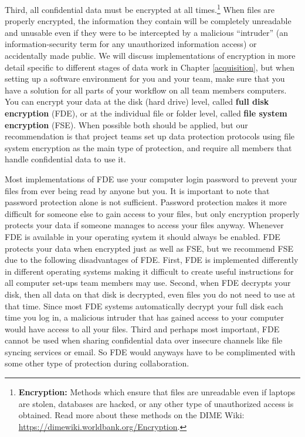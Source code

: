 \documentclass[
]{book}
\begin{document}
Third, all confidential data must be encrypted at all times.\footnote{\textbf{Encryption:} Methods which ensure that files are unreadable
  even if laptops are stolen, databases are hacked,
  or any other type of unauthorized access is obtained.
  Read more about these methods on the DIME Wiki:
  \url{https://dimewiki.worldbank.org/Encryption}.}
When files are properly encrypted,
the information they contain will be completely unreadable and unusable
even if they were to be intercepted by a malicious ``intruder''
(an information-security term for any unauthorized information access)
or accidentally made public.
We will discuss implementations of encryption in more detail
specific to different stages of data work in Chapter \ref{acquisition},
but when setting up a software environment for you and your team,
make sure that you have a solution for
all parts of your workflow on all team members computers.
You can encrypt your data at the disk (hard drive) level,
called \textbf{full disk encryption} (FDE), or at the individual file or folder level,
called \textbf{file system encryption} (FSE).
When possible both should be applied,
but our recommendation is that
project teams set up data protection protocols
using file system encryption as the main type of protection,
and require all members that handle confidential data to use it.

Most implementations of FDE use your computer login password to
prevent your files from ever being read by anyone but you.
It is important to note that password protection alone is not sufficient.
Password protection makes it more difficult for someone else to gain access to your files,
but only encryption properly protects your data if someone manages to access your files anyway.
Whenever FDE is available in your operating system
it should always be enabled.
FDE protects your data when encrypted just as well as FSE,
but we recommend FSE due to the following disadvantages of FDE.
First, FDE is implemented differently in different operating systems
making it difficult to create useful instructions
for all computer set-ups team members may use.
Second, when FDE decrypts your disk,
then all data on that disk is decrypted, even
files you do not need to use at that time.
Since most FDE systems automatically decrypt your full disk each time you log in,
a malicious intruder that has gained access to your computer would have access to all your files.
Third and perhaps most important,
FDE cannot be used when sharing confidential data
over insecure channels like file syncing services or email.
So FDE would anyways have to be complimented with
some other type of protection during collaboration.
\end{document}
